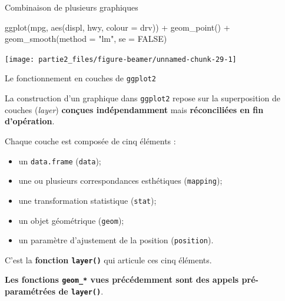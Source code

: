 \documentclass[12pt,ignorenonframetext,]{beamer}
\newenvironment{Shaded}{}{}
\newcommand{\KeywordTok}[1]{\textcolor[rgb]{0.00,0.00,1.00}{#1}}
\newcommand{\DataTypeTok}[1]{#1}
\newcommand{\StringTok}[1]{\textcolor[rgb]{0.00,0.50,0.50}{#1}}
\newcommand{\OtherTok}[1]{\textcolor[rgb]{1.00,0.25,0.00}{#1}}
\newcommand{\OperatorTok}[1]{#1}
\newcommand{\NormalTok}[1]{#1}
\providecommand{\tightlist}{%
  \setlength{\itemsep}{0pt}\setlength{\parskip}{0pt}}
\renewenvironment{Shaded}{\begin{snugshade}}{\end{snugshade}}
\begin{document}
\begin{frame}[fragile]{Combinaison de plusieurs graphiques}

\footnotesize \center

\begin{Shaded}
\begin{Highlighting}[]
\KeywordTok{ggplot}\NormalTok{(mpg, }\KeywordTok{aes}\NormalTok{(displ, hwy, }\DataTypeTok{colour =}\NormalTok{ drv)) }\OperatorTok{+}
\StringTok{  }\KeywordTok{geom_point}\NormalTok{() }\OperatorTok{+}\StringTok{ }\KeywordTok{geom_smooth}\NormalTok{(}\DataTypeTok{method =} \StringTok{"lm"}\NormalTok{, }\DataTypeTok{se =} \OtherTok{FALSE}\NormalTok{)}
\end{Highlighting}
\end{Shaded}

\texttt{[image: partie2\_files/figure-beamer/unnamed-chunk-29-1]}

\end{frame}

\begin{frame}[fragile]{\large Le fonctionnement en \og couches \fg{} de
\texttt{ggplot2}}

La construction d'un graphique dans \texttt{ggplot2} repose sur la
superposition de couches (\emph{layer}) \textbf{conçues indépendamment}
mais \textbf{réconciliées en fin d'opération}.

\pause Chaque couche est composée de cinq éléments :

\begin{itemize}
\tightlist
\item
  un \texttt{data.frame} (\texttt{data});
\item
  une ou plusieurs correspondances esthétiques (\texttt{mapping});
\item
  une transformation statistique (\texttt{stat});
\item
  un objet géométrique (\texttt{geom});
\item
  un paramètre d'ajustement de la position (\texttt{position}).
\end{itemize}

C'est la \textbf{fonction \texttt{layer()}} qui articule ces cinq
éléments.

\pause 

\textbf{Les fonctions \texttt{geom\_*} vues précédemment sont des appels
pré-paramétrées de \texttt{layer()}}.

\end{frame}
\end{document}

